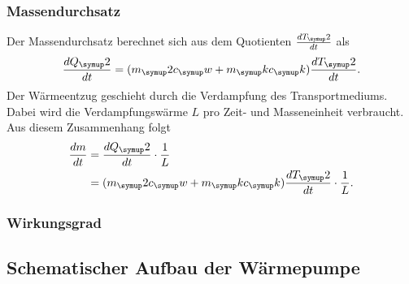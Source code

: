 \subsubsection{Massendurchsatz}
Der Massendurchsatz berechnet sich aus dem Quotienten $\frac{dT_\su{2}}{dt}$ als
\begin{equation}
  \frac{dQ_\su{2}}{dt}= (m_\su{2}c_\su{w}+m_\su{k}c_\su{k})\frac{dT_\su{2}}{dt}.
\end{equation}
Der Wärmeentzug geschieht durch die Verdampfung des Transportmediums. Dabei wird die
Verdampfungswärme $L$ pro Zeit- und Masseneinheit verbraucht. Aus diesem Zusammenhang folgt
\begin{align}
  \frac{dm}{dt} &= \frac{dQ_\su{2}}{dt} \cdot \frac{1}{L} \\
      &= (m_\su{2}c_\su{w}+m_\su{k}c_\su{k})\frac{dT_\su{2}}{dt} \cdot \frac{1}{L}.
\end{align}
\subsubsection{Wirkungsgrad}
\subsection{Schematischer Aufbau der Wärmepumpe}
